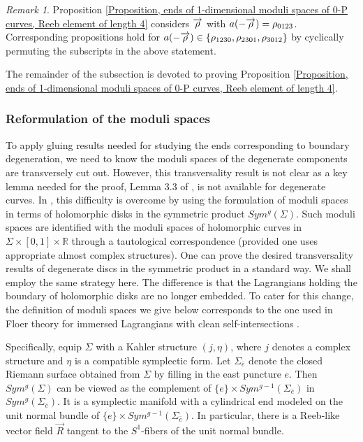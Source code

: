 \documentclass{amsart}
\theoremstyle{definition}
\theoremstyle{remark}
\newtheorem{rmk}[thm]{Remark}
\numberwithin{equation}{section}
\numberwithin{equation}{section} \makeatletter
\begin{document}
\begin{rmk}
Proposition \ref{Proposition, ends of 1-dimensional moduli spaces of 0-P curves, Reeb element of length 4} considers $\overrightarrow{\bold{\rho}}$ with $a(-\overrightarrow{\bold{\rho}})=\rho_{0123}$. Corresponding propositions hold for $a(-\overrightarrow{\bold{\rho}})\in \{\rho_{1230},\rho_{2301},\rho_{3012}\}$ by cyclically permuting the subscripts in the above statement. 
\end{rmk}
The remainder of the subsection is devoted to proving Proposition \ref{Proposition, ends of 1-dimensional moduli spaces of 0-P curves, Reeb element of length 4}.

\subsubsection{Reformulation of the moduli spaces}\label{Subsection, moduli space of 0-P curves in Symmetric products}
To apply gluing results needed for studying the ends corresponding to boundary degeneration, we need to know the moduli spaces of the degenerate components are transversely cut out. However, this transversality result is not clear as a key lemma needed for the proof, Lemma 3.3 of \cite{MR2240908}, is not available for degenerate curves. In \cite{LOT18}, this difficulty is overcome by using the formulation of moduli spaces in terms of holomorphic disks in the symmetric product $Sym^g(\Sigma)$. Such moduli spaces are identified with the moduli spaces of holomorphic curves in $\Sigma\times[0,1]\times \mathbb{R}$ through a tautological correspondence (provided one uses appropriate almost complex structures). One can prove the desired transversality results of degenerate discs in the symmetric product in a standard way. We shall employ the same strategy here. The difference is that the Lagrangians holding the boundary of holomorphic disks are no longer embedded. To cater for this change, the definition of moduli spaces we give below corresponds to the one used in Floer theory for immersed Lagrangians with clean self-intersections \cite{Alston2018, Fukaya2017}.

Specifically, equip $\Sigma$ with a Kahler structure $(j,\eta)$, where $j$ denotes a complex structure and $\eta$ is a compatible symplectic form. Let $\Sigma_{\bar{e}}$ denote the closed Riemann surface obtained from $\Sigma$ by filling in the east puncture $e$. Then $Sym^g(\Sigma)$ can be viewed as the complement of $\{e\}\times Sym^{g-1}(\Sigma_{\bar{e}})$ in $Sym^g(\Sigma_{\bar{e}})$. It is a symplectic manifold with a cylindrical end modeled on the unit normal bundle of $\{e\}\times Sym^{g-1}(\Sigma_{\bar{e}})$. In particular, there is a Reeb-like vector field $\overrightarrow{R}$ tangent to the $S^1$-fibers of the unit normal bundle.
\end{document}
